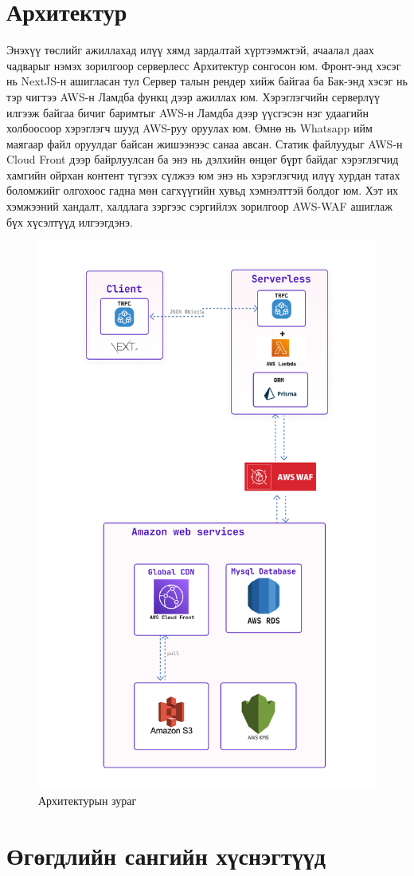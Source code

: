 \section{Архитектур}
Энэхүү төслийг ажиллахад илүү хямд зардалтай хүртээмжтэй, ачаалал даах чадварыг нэмэх зорилгоор серверлесс Архитектур сонгосон юм. Фронт-энд хэсэг нь NextJS-н ашигласан тул Сервер талын рендер хийж байгаа ба Бак-энд хэсэг нь тэр чигтээ AWS-н Ламдба функц дээр ажиллах юм. Хэрэглэгчийн серверлүү илгээж байгаа бичиг баримтыг AWS-н Ламдба дээр үүсгэсэн нэг удаагийн холбоосоор хэрэглэгч шууд AWS-руу оруулах юм. Өмнө нь Whatsapp ийм маягаар файл оруулдаг байсан жишээнээс санаа авсан. Статик файлуудыг AWS-н Cloud Front дээр байрлуулсан ба энэ нь дэлхийн өнцөг бүрт байдаг хэрэглэгчид хамгийн ойрхан контент түгээх сүлжээ юм энэ нь хэрэглэгчид илүү хурдан татах боломжийг олгохоос гадна мөн сагхүүгийн хувьд хэмнэлттэй болдог юм. Хэт их хэмжээний хандалт, халдлага зэргээс сэргийлэх зорилгоор AWS-WAF ашиглаж бүх хүсэлтүүд илгээгдэнэ.
\begin{figure}[h!]
	\centering
	\includegraphics[scale=0.32]{assets/server.png}
	\caption{Архитектурын зураг}
	\label{fig:architecture}
\end{figure}
\pagebreak
\newpage
\section[ӨС хүснэгтүүд]{Өгөгдлийн сангийн хүснэгтүүд}

\pagebreak
\newpage

